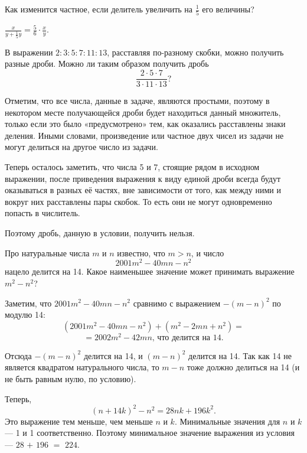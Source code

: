 
\begin{itemize}

	\itA Как изменится частное, если делитель увеличить на $\tfrac{1}{5}$ его величины?
	
	\itr $\frac{x}{y + \frac{1}{5}y} = \frac{5}{6} \cdot \frac{x}{y}$.
	
	\itB В выражении $2 : 3 : 5 : 7 : 11 : 13$, расставляя по-разному скобки, можно получить разные дроби. Можно ли таким образом получить дробь
	$$\frac{2 \cdot 5 \cdot 7}{3 \cdot 11 \cdot 13}?$$
	
	\itr Отметим, что все числа, данные в задаче, являются простыми, поэтому в некотором месте получающейся дроби будет находиться данный множитель, только если это было «предусмотрено» тем, как оказались расставлены знаки деления. Иными словами, произведение или частное двух чисел из задачи не могут делиться на другое число из задачи.
	
	Теперь осталось заметить, что числа 5 и 7, стоящие рядом в исходном выражении, после приведения выражения к виду единой дроби всегда будут оказываться в разных её частях, вне зависимости от того, как между ними и вокруг них расставлены пары скобок. То есть они не могут одновременно попасть в числитель.
	
	Поэтому дробь, данную в условии, получить нельзя.
	
	\itC Про натуральные числа $m$ и $n$ известно, что $m>n$, и число
	$$2001m^2 - 40 mn - n^2$$
	нацело делится на 14. Какое наименьшее значение может принимать выражение $m^2 - n^2$?
	
	\itr Заметим, что $2001m^2 - 40 mn - n^2$ сравнимо с выражением $-(m-n)^2$ по модулю 14:
	$$(2001m^2 - 40 mn - n^2) + (m^2 - 2mn+n^2) =$$
	$$= 2002 m^2 - 42 mn\text{,\ \ что делится на 14.}$$
	
	Отсюда $-(m-n)^2$ делится на 14, и $(m-n)^2$ делится на 14. Так как 14 не является квадратом натурального числа, то $m-n$ тоже должно делиться на 14 (и не быть равным нулю, по условию).
	
	Теперь,
	$$(n+14k)^2 - n^2 = 28nk + 196k^2.$$
	Это выражение тем меньше, чем меньше $n$ и $k$. Минимальные значения для $n$ и $k$ — 1 и 1 соответственно. Поэтому минимальное значение выражения из условия — $28$ $+$ $196$ $=$ $224$.

\end{itemize}